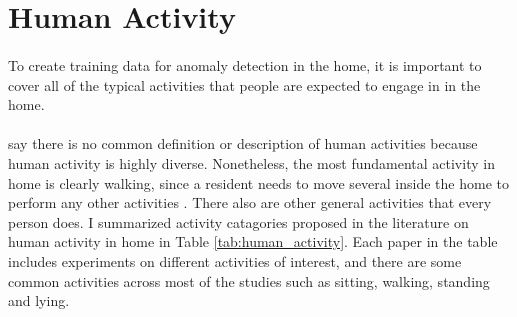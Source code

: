 \section{Human Activity}
\paragraph{}
To create training data for anomaly detection in the home, it is important to cover all of the typical activities that people are expected to engage in in the home.

\paragraph{}
\citeauthor{schrader_2020} \citeyear{schrader_2020}  say there is no common definition or description of human activities because human activity is highly diverse. Nonetheless, the most fundamental activity in home is clearly walking, since a resident needs to move several inside the home to perform any other activities \cite{oukrich_2019}. There also are other general activities that every person does. I summarized activity catagories proposed in the literature on human activity in home in Table \ref{tab:human_activity}. Each paper in the table includes experiments on different activities of interest, and there are some common activities across most of the studies such as sitting, walking, standing and lying.

